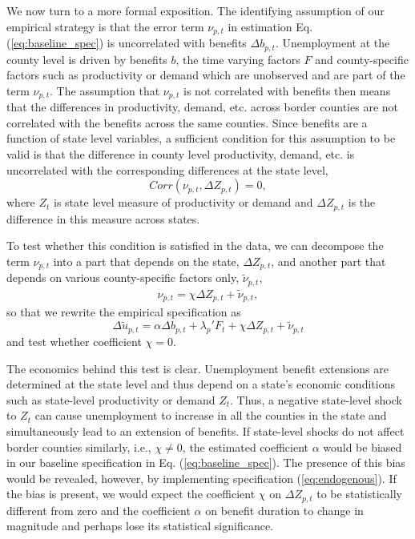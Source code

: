 \documentclass[12pt]{article}
\newcommand{\1}{\mathbf{1}}
\newcommand{\beq}{\begin{eqnarray}}
\newcommand{\eeq}{\end{eqnarray}}
\begin{document}
\vspace{0.4cm} We now turn to a more formal exposition. The identifying assumption of our empirical strategy is that the error term $\nu_{p,t}$ in estimation Eq. (\ref{eq:baseline_spec}) is uncorrelated with benefits $\Delta b_{p,t}$. Unemployment at the county level is driven by benefits $b$, the time varying factors $F$ and county-specific factors such as productivity or demand which are unobserved and are part of the term $\nu_{p,t}$. The assumption that $\nu_{p,t}$ is not correlated with benefits then means that the differences in productivity, demand, etc. across border counties are not correlated with the benefits across the same counties. Since benefits are a function of state level variables, a sufficient condition for this assumption to be valid is that the difference in county level productivity, demand, etc. is uncorrelated with the corresponding differences at the state level,
\begin{equation} \label{assu:identify}
Corr (\nu_{p,t}, \Delta Z_{p,t}) = 0,
\end{equation}
where $Z_{t}$ is state level measure of productivity or demand and $\Delta Z_{p,t}$ is the difference in this measure across states. 

To test whether this condition is satisfied in the data, we can decompose the term $\nu_{p,t}$ into a part that depends on the state, $\Delta Z_{p,t}$, and another part that depends on various county-specific factors only, $\tilde{\nu}_{p,t}$,
\beq
\nu_{p,t} = \chi \Delta Z_{p,t} + \tilde{\nu}_{p,t},
\eeq
so that we rewrite the empirical specification as
\begin{equation} \label{eq:endogenous}
\Delta \tilde{u}_{p,t} =  \alpha \Delta b_{p,t} +\lambda_{p}'F_{t}+ \chi \Delta Z_{p,t} + \tilde{\nu}_{p,t}
\end{equation}
and test whether coefficient $\chi=0$.

The economics behind this test is clear. Unemployment benefit extensions are determined at the state level and thus depend on a state's economic conditions such as state-level productivity or demand $Z_t$. Thus, a negative state-level shock to $Z_t$ can cause unemployment to increase in all the counties in the state and simultaneously lead to an extension of benefits. If state-level shocks do not affect border counties similarly, i.e., $\chi \not= 0$, the estimated coefficient $\alpha$ would be biased in our baseline specification in Eq. (\ref{eq:baseline_spec}).  The presence of this bias would be revealed, however, by implementing specification (\ref{eq:endogenous}). If the bias is present, we would expect the coefficient $\chi$ on $\Delta Z_{p,t}$ to be statistically different from zero and the coefficient $\alpha$ on benefit duration to change in magnitude and perhaps lose its statistical significance.
\end{document}
